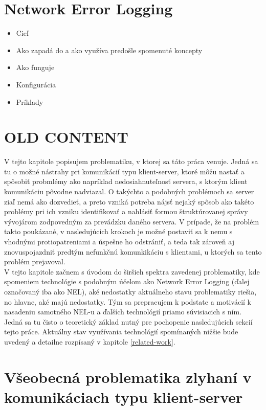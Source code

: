 \section{Network Error Logging}
\begin{itemize}
    \item Cieľ
    \item Ako zapadá do a ako využíva predošle spomenuté koncepty
    \item Ako funguje
    \item Konfigurácia
    \item Príklady
\end{itemize}



\section{OLD CONTENT}
V tejto kapitole popisujem problematiku, v ktorej sa táto práca venuje. Jedná sa tu o možné nástrahy pri komunikácií typu klient-server,
ktoré môžu nastať a spôsobiť probmlémy ako napríklad nedosiahnuteľnosť servera, s ktorým klient komunikáciu pôvodne nadviazal.
O takýchto a podobných problémoch sa server ziaľ nemá ako dozvedieť, a preto vzniká potreba nájsť nejaký spôsob ako takéto problémy pri ich
vzniku identifikovať a nahlásiť formou štruktúrovanej správy vývojárom zodpovedným za prevádzku daného servera. V prípade, že 
na problém takto poukázané, v nasledujúcich krokoch je možné postaviť sa k nemu s vhodnými protiopatreniami a úspešne ho odstrániť, a teda 
tak zároveň aj znovuspojazdniť predtým nefunkčnú komunkikáciu s klientami, u ktorých sa tento problém prejavoval.
\\
V tejto kapitole začnem s úvodom do širšieh spektra zavedenej problematiky, kde spomeniem technológie s podobným účelom 
ako Network Error Logging (ďalej označovaný iba ako NEL), aké nedostatky aktuálneho stavu problematiky riešia, no hlavne, aké majú nedostatky. 
Tým sa prepracujem k podstate a motivácií k nasadeniu samotného NEL-u a ďalších technológií priamo súvisiacich s ním. 
Jedná sa tu čisto o teoretický základ nutný pre pochopenie nasledujúcich sekcií tejto práce. 
Aktuálny stav využívania technológií spomínaných nižšie bude uvedený a detailne rozpísaný v kapitole \ref{related-work}.

\section{Všeobecná problematika zlyhaní v komunikáciach typu klient-server}

